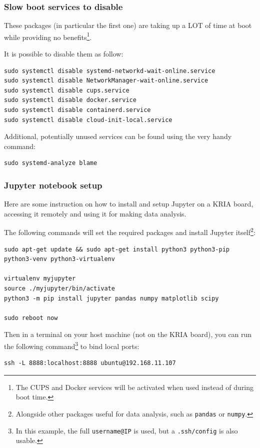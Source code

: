 \documentclass[10pt]{article}
\begin{document}
\pagebreak

\subsubsection{Slow boot services to disable}
\label{sec:org5d944ff}
These packages (in particular the first one) are taking up a LOT of time at boot while providing no benefits\footnote{The CUPS and Docker services will be activated when used instead of during boot time.}.

It is possible to disable them as follow:
\begin{verbatim}
sudo systemctl disable systemd-networkd-wait-online.service
sudo systemctl disable NetworkManager-wait-online.service
sudo systemctl disable cups.service
sudo systemctl disable docker.service
sudo systemctl disable containerd.service
sudo systemctl disable cloud-init-local.service
\end{verbatim}

Additional, potentially unused services can be found using the very handy command:
\begin{verbatim}
sudo systemd-analyze blame
\end{verbatim}

\subsubsection{Jupyter notebook setup}
\label{sec:org9b96978}
Here are some instruction on how to install and setup Jupyter on a KRIA board,
accessing it remotely and using it for making data analysis.

The following commands will set the required packages and install Jupyter itself\footnote{Alongside other packages useful for data analysis, such as \texttt{pandas} or \texttt{numpy}.}:
\begin{verbatim}
sudo apt-get update && sudo apt-get install python3 python3-pip python3-venv python3-virtualenv

virtualenv myjupyter
source ./myjupyter/bin/activate
python3 -m pip install jupyter pandas numpy matplotlib scipy

sudo reboot now
\end{verbatim}

Then in a terminal on your host machine (not on the KRIA board), you can run the following command\footnote{In this example, the full \texttt{username@IP} is used, but a \texttt{.ssh/config} is also usable.} to bind local ports:
\begin{verbatim}
ssh -L 8888:localhost:8888 ubuntu@192.168.11.107
\end{verbatim}
\end{document}
